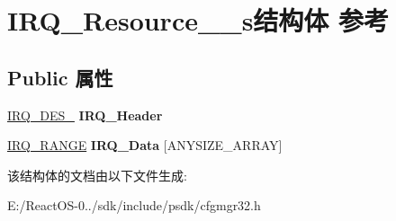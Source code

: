 \hypertarget{struct_i_r_q___resource__32__s}{}\section{I\+R\+Q\+\_\+\+Resource\+\_\+\_\+s结构体 参考}
\label{struct_i_r_q___resource__32__s}
\subsection*{Public 属性}
\begin{DoxyCompactItemize}
\item 
\mbox{\label{struct_i_r_q___resource__32__s_a691caaa686a1cc22a6689ae16f97efa6}} 
\hyperlink{struct_i_r_q___des__32__s}{I\+R\+Q\+\_\+\+D\+E\+S\+\_} {\bfseries I\+R\+Q\+\_\+\+Header}
\item 
\mbox{\label{struct_i_r_q___resource__32__s_a1997a3e8dc6801b0323edd24eebef360}} 
\hyperlink{struct_i_r_q___range__s}{I\+R\+Q\+\_\+\+R\+A\+N\+GE} {\bfseries I\+R\+Q\+\_\+\+Data} \mbox{[}A\+N\+Y\+S\+I\+Z\+E\+\_\+\+A\+R\+R\+AY\mbox{]}
\end{DoxyCompactItemize}


该结构体的文档由以下文件生成\+:\begin{DoxyCompactItemize}
\item 
E\+:/\+React\+O\+S-\/0../sdk/include/psdk/cfgmgr32.\+h\end{DoxyCompactItemize}
